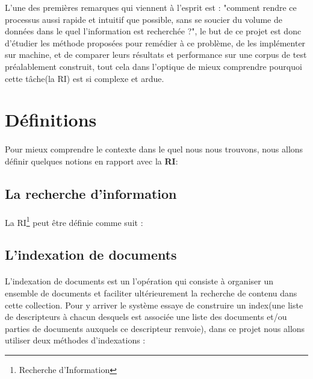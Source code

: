 \documentclass[12pt]{report}
\begin{document}
	\par
	L'une des premières remarques qui viennent à l'esprit est : "comment rendre ce processus
 	aussi rapide et intuitif que possible, sans se soucier du volume de données dans le quel
 	l'information est recherchée ?", le but de ce projet est donc d'étudier les méthode 
 	proposées pour remédier à ce problème, de les implémenter sur machine, et de comparer 
 	leurs résultats et performance sur une corpus de test préalablement construit, tout cela 
 	dans l'optique de mieux comprendre pourquoi cette tâche(la RI) est si complexe et ardue.
	
	\section{Définitions}
	\paragraph{}
	Pour mieux comprendre le contexte dans le quel nous nous trouvons, nous allons définir
	quelques notions en rapport avec la \textbf{RI}:
		\subsection{La recherche d'information}
		\paragraph{}
		La RI\footnote{Recherche d'Information} peut être définie comme suit : 
		\begin{quote}
		\end{quote}
		
		
		\subsection{L'indexation de documents}
		\paragraph{}
		L’indexation de documents est un l'opération qui consiste à organiser un ensemble de documents 
		et faciliter ultérieurement la recherche de contenu dans cette collection. Pour y arriver le 
		système essaye de construire un index(une liste de descripteurs à chacun desquels est associée 
		une liste des documents et/ou parties de documents auxquels ce descripteur renvoie), dans ce
		projet nous allons utiliser deux méthodes d'indexations : 
\end{document}
